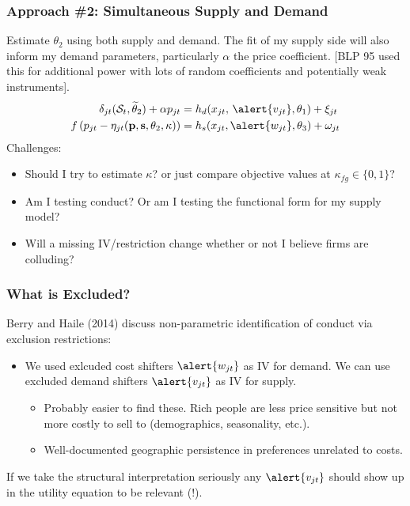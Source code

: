 \documentclass[xcolor=pdftex,dvipsnames,table,mathserif,aspectratio=169]{beamer}
\begin{document}
\begin{frame}
\frametitle{Approach \#2: Simultaneous Supply and Demand}
Estimate $\theta_2$ using both supply and demand. The fit of my supply side will also inform my demand parameters, particularly $\alpha$ the price coefficient. [BLP 95 used this for additional power with lots of random coefficients and potentially weak instruments].
\begin{align*}
\delta_{jt}(\mathcal{S}_t,\widetilde{\theta}_2) + \alpha p_{jt} &= h_d(x_{jt}, \, \alert{v_{jt}},\theta_1)  + \xi_{jt} \\
 f \left( p_{jt} - \eta_{jt}(\mathbf{p},\mathbf{s},\theta_2,\kappa) \right) &= h_s(x_{jt}, \alert{w_{jt}},\theta_3) + \omega_{jt}
\end{align*}
Challenges:
\begin{itemize}
\item Should I try to estimate $\kappa$? or just compare objective values at $\kappa_{fg}\in\{0,1\}$?
\item Am I testing conduct? Or am I testing the functional form for my supply model?
\item Will a missing IV/restriction change whether or not I believe firms are colluding?
\end{itemize}
\end{frame}

\begin{frame}
\frametitle{What is Excluded?}
Berry and Haile (2014) discuss \alert{non-parametric} identification of conduct via exclusion restrictions:
\begin{itemize}
\item We used exlcuded cost shifters $\alert{w_{jt}}$ as IV for demand. We can use excluded demand shifters $\alert{v_{jt}}$ as IV for supply.
\begin{itemize}
\item Probably easier to find these. Rich people are less price sensitive but not more costly to sell to (demographics, seasonality, etc.).
\item Well-documented geographic persistence in preferences unrelated to costs.
\end{itemize}
\end{itemize}
 If we take the structural interpretation seriously any $\alert{v_{jt}}$ should show up in the utility equation to be \alert{relevant} (!).
\end{frame}
\end{document}
